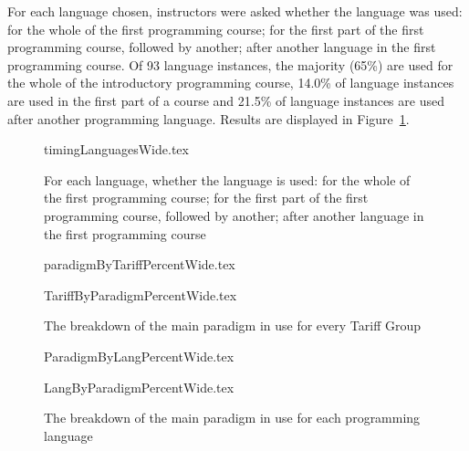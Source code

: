 \documentclass[english,submission]{programming}
\begin{document}
For each language chosen, instructors were asked whether the language
was used: for the whole of the first programming course; for the first
part of the first programming course, followed by another; after
another language in the first programming course. Of 93 language
instances, the majority (65\%) are used for the whole of the
introductory programming course, 14.0\% of language instances are used
in the first part of a course and 21.5\% of language instances are
used after another programming language. Results are displayed in
Figure~\ref{fig:timing}.

\begin{figure}
\begin{center}
{timingLanguagesWide.tex}
\end{center}
\caption{For each language, whether the language is used: for the whole of the first programming course; for the first part of the first programming course, followed by another; after another language in the first programming course
\label{fig:timing}}
\end{figure}




\begin{figure}
\begin{center}
{paradigmByTariffPercentWide.tex}
\end{center}
\begin{center}
{TariffByParadigmPercentWide.tex}
\end{center}
\caption{The breakdown of the main paradigm in use for every Tariff Group\label{fig:paradigmTariff}}
\end{figure}

\begin{figure}
\begin{center}
{ParadigmByLangPercentWide.tex}
\end{center}
\begin{center}
{LangByParadigmPercentWide.tex}
\end{center}
\caption{The breakdown of the main paradigm in use for each programming language\label{fig:paradigmLang}}
\end{figure}
\end{document}
